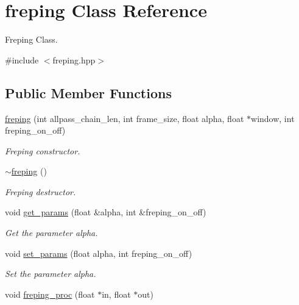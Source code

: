 \hypertarget{classfreping}{}\section{freping Class Reference}
\label{classfreping}


Freping Class.  




{\ttfamily \#include $<$freping.\+hpp$>$}

\subsection*{Public Member Functions}
\begin{DoxyCompactItemize}
\item 
\hyperlink{classfreping_a2df9985dad679cb5f796d75367b28b2c}{freping} (int allpass\+\_\+chain\+\_\+len, int frame\+\_\+size, float alpha, float $\ast$window, int freping\+\_\+on\+\_\+off)
\begin{DoxyCompactList}\small\item\em Freping constructor. \end{DoxyCompactList}\item 
\mbox{\label{classfreping_a9af0fab164c325edb28cd97a8dcaf74a}} 
\hyperlink{classfreping_a9af0fab164c325edb28cd97a8dcaf74a}{$\sim$freping} ()
\begin{DoxyCompactList}\small\item\em Freping destructor. \end{DoxyCompactList}\item 
void \hyperlink{classfreping_a0028d0a70f920dddae2d8fab614de880}{get\+\_\+params} (float \&alpha, int \&freping\+\_\+on\+\_\+off)
\begin{DoxyCompactList}\small\item\em Get the parameter alpha. \end{DoxyCompactList}\item 
void \hyperlink{classfreping_acb0eb9617755641b866e8fc9c84681cd}{set\+\_\+params} (float alpha, int freping\+\_\+on\+\_\+off)
\begin{DoxyCompactList}\small\item\em Set the parameter alpha. \end{DoxyCompactList}\item 
void \hyperlink{classfreping_a610d4b0c36b090709808dac0fe57dc77}{freping\+\_\+proc} (float $\ast$in, float $\ast$out)
\end{DoxyCompactItemize}
